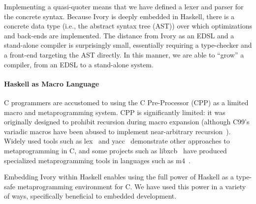 Implementing a quasi-quoter means that we have defined a lexer and parser for
the concrete syntax. Because Ivory is deeply embedded in Haskell, there is a
concrete data type (i.e., the abstract syntax tree (AST)) over which
optimizations and back-ends are implemented. The distance from Ivory as an EDSL
and a stand-alone compiler is surprisingly small, essentially requiring a
type-checker and a front-end targeting the AST directly. In this manner, we are
able to ``grow'' a compiler, from an EDSL to a stand-alone system.


\paragraph{Haskell as Macro Language}
C programmers are accustomed to using the C Pre-Processor (CPP) as a limited
macro and metaprogramming system. CPP is significantly limited: it was
originally designed to prohibit recursion during macro expansion (although
C99's variadic macros have been abused to implement near-arbitrary
recursion~\cite{cpp-turing}). Widely used tools such as lex~\cite{lex} and
yacc~\cite{yacc} demonstrate other approaches to metaprogramming in C, and some
projects such as libxcb~\cite{xcb} have produced specialized metaprogramming
tools in languages such as m4~\cite{m4}.

Embedding Ivory within Haskell enables using the full power of Haskell as a
type-safe metaprogramming environment for C. We have used this power in a
variety of ways, specifically beneficial to embedded development.

